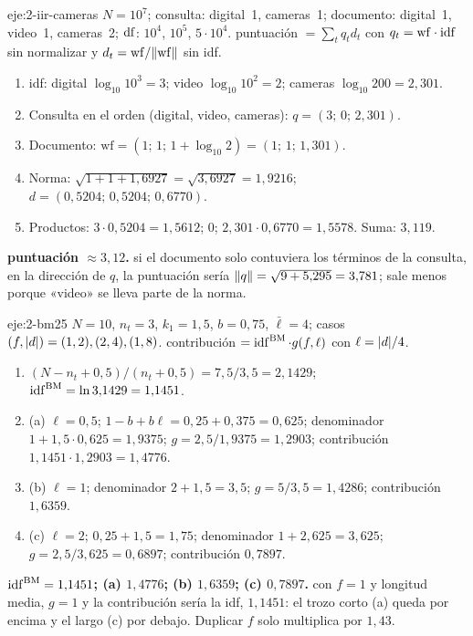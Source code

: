 \begin{solucion}{eje:2-iir-cameras}
\datos $N=10^{7}$; consulta: digital~1, cameras~1; documento: digital~1, video~1, cameras~2; $\operatorname{df}$: $10^{4}$, $10^{5}$, $5\cdot 10^{4}$.
\planteamiento puntuación $=\sum_t q_td_t$ con $q_t=\mathrm{wf}\cdot\operatorname{idf}$ sin normalizar y $d_t=\mathrm{wf}/\lVert\mathrm{wf}\rVert$ sin idf.
\pasos
\begin{enumerate}[label=\arabic*.]
  \item idf: digital $\log_{10}10^{3}=3$; video $\log_{10}10^{2}=2$; cameras $\log_{10}200=2{,}301$.
  \item Consulta en el orden (digital, video, cameras): $q=(3;\,0;\,2{,}301)$.
  \item Documento: $\mathrm{wf}=(1;\,1;\,1+\log_{10}2)=(1;\,1;\,1{,}301)$.
  \item Norma: $\sqrt{1+1+1{,}6927}=\sqrt{3{,}6927}=1{,}9216$; $d=(0{,}5204;\,0{,}5204;\,0{,}6770)$.
  \item Productos: $3\cdot 0{,}5204=1{,}5612$; $0$; $2{,}301\cdot 0{,}6770=1{,}5578$. Suma: $3{,}119$.
\end{enumerate}
\resultado \textbf{puntuación $\approx 3{,}12$.}
\comprobacion si el documento solo contuviera los términos de la consulta, en la dirección de $q$, la puntuación sería $\lVert q\rVert=\sqrt{9+5{,}295}=3{,}781$; sale menos porque «video» se lleva parte de la norma.
\end{solucion}

\begin{solucion}{eje:2-bm25}
\datos $N=10$, $n_t=3$, $k_1=1{,}5$, $b=0{,}75$, $\bar\ell=4$; casos $(f,\lvert d\rvert)=(1,2),(2,4),(1,8)$.
\planteamiento contribución $=\operatorname{idf}^{\mathrm{BM}}\cdot g(f,\ell)$ con $\ell=\lvert d\rvert/4$.
\pasos
\begin{enumerate}[label=\arabic*.]
  \item $(N-n_t+0{,}5)/(n_t+0{,}5)=7{,}5/3{,}5=2{,}1429$; $\operatorname{idf}^{\mathrm{BM}}=\ln 3{,}1429=1{,}1451$.
  \item (a) $\ell=0{,}5$; $1-b+b\ell=0{,}25+0{,}375=0{,}625$; denominador $1+1{,}5\cdot 0{,}625=1{,}9375$; $g=2{,}5/1{,}9375=1{,}2903$; contribución $1{,}1451\cdot 1{,}2903=1{,}4776$.
  \item (b) $\ell=1$; denominador $2+1{,}5=3{,}5$; $g=5/3{,}5=1{,}4286$; contribución $1{,}6359$.
  \item (c) $\ell=2$; $0{,}25+1{,}5=1{,}75$; denominador $1+2{,}625=3{,}625$; $g=2{,}5/3{,}625=0{,}6897$; contribución $0{,}7897$.
\end{enumerate}
\resultado \textbf{$\operatorname{idf}^{\mathrm{BM}}=1{,}1451$; (a) $1{,}4776$; (b) $1{,}6359$; (c) $0{,}7897$.}
\comprobacion con $f=1$ y longitud media, $g=1$ y la contribución sería la idf, $1{,}1451$: el trozo corto (a) queda por encima y el largo (c) por debajo. Duplicar $f$ solo multiplica por $1{,}43$.
\end{solucion}

